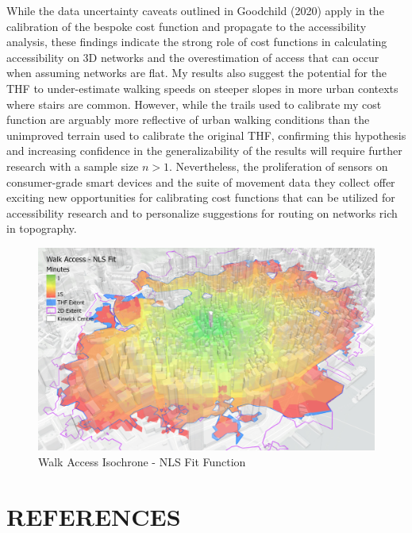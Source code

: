 \documentclass{article}
\begin{document}
While the data uncertainty caveats outlined in Goodchild (2020) apply in
the calibration of the bespoke cost function and propagate to the
accessibility analysis, these findings indicate the strong role of cost
functions in calculating accessibility on 3D networks and the
overestimation of access that can occur when assuming networks are flat.
My results also suggest the potential for the THF to under-estimate
walking speeds on steeper slopes in more urban contexts where stairs are
common. However, while the trails used to calibrate my cost function are
arguably more reflective of urban walking conditions than the unimproved
terrain used to calibrate the original THF, confirming this hypothesis
and increasing confidence in the generalizability of the results will
require further research with a sample size \(n>1\). Nevertheless, the
proliferation of sensors on consumer-grade smart devices and the suite
of movement data they collect offer exciting new opportunities for
calibrating cost functions that can be utilized for accessibility
research and to personalize suggestions for routing on networks rich in
topography.

\begin{figure}[H]
\includegraphics[width=1\linewidth]{./img/Fig_3} \caption{Walk Access Isochrone - NLS Fit Function}\label{fig:fig-iso}
\end{figure}

\hypertarget{references}{%
\section*{REFERENCES}\label{references}}
\end{document}
